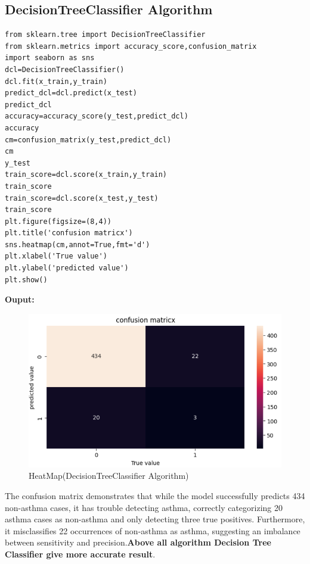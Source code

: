\subsection{DecisionTreeClassifier Algorithm}
\begin{verbatim}
from sklearn.tree import DecisionTreeClassifier
from sklearn.metrics import accuracy_score,confusion_matrix
import seaborn as sns
dcl=DecisionTreeClassifier()
dcl.fit(x_train,y_train)
predict_dcl=dcl.predict(x_test)
predict_dcl
accuracy=accuracy_score(y_test,predict_dcl)
accuracy
cm=confusion_matrix(y_test,predict_dcl)
cm
y_test
train_score=dcl.score(x_train,y_train)
train_score
train_score=dcl.score(x_test,y_test)
train_score
plt.figure(figsize=(8,4))
plt.title('confusion matricx')
sns.heatmap(cm,annot=True,fmt='d')
plt.xlabel('True value')
plt.ylabel('predicted value')
plt.show()
\end{verbatim}
\textbf{Ouput:}
\begin{figure}[h]
\centering
\includegraphics[width=0.7\linewidth]{Images/r3.png}
\caption{HeatMap(DecisionTreeClassifier Algorithm)}
\label{fig:enter-label}
\end{figure}
The confusion matrix demonstrates that while the model successfully predicts 434 non-asthma cases, it has trouble detecting asthma, correctly categorizing 20 asthma cases as non-asthma and only detecting three true positives. Furthermore, it misclassifies 22 occurrences of non-asthma as asthma, suggesting an imbalance between sensitivity and precision.\textbf{Above all algorithm Decision Tree Classifier give more accurate result}.

